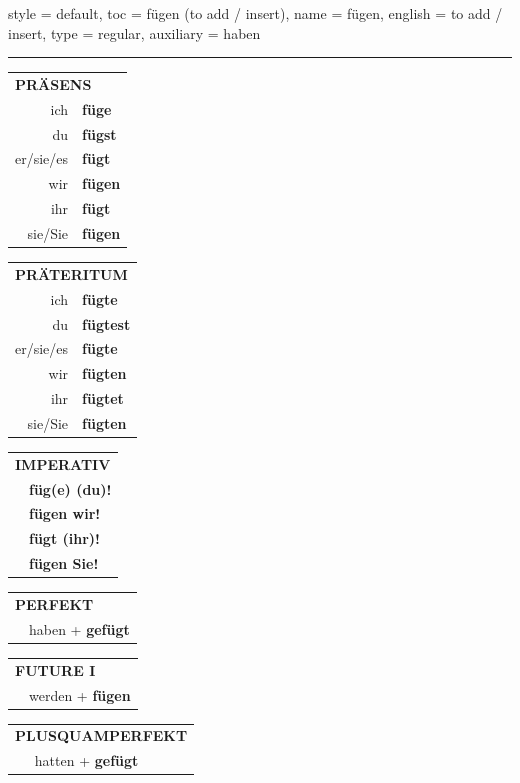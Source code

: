 \begin{verbentry}{
  style = {default},
  toc = {fügen (to add / insert)},
  name = {fügen},
  english = {to add / insert},
  type = {regular},
  auxiliary = {haben}
}


\vspace{5pt}
\hrule
\vspace{5pt}

\begin{tabular}{rl}
\multicolumn{2}{l}{\textbf{PRÄSENS}}\\
ich & \textbf{füge}\\
du & \textbf{fügst}\\
er/sie/es & \textbf{fügt}\\
wir & \textbf{fügen}\\
ihr & \textbf{fügt}\\
sie/Sie & \textbf{fügen}\\
\end{tabular}
\hfill
\begin{tabular}{rl}
\multicolumn{2}{l}{\textbf{PRÄTERITUM}}\\
ich & \textbf{fügte}\\
du & \textbf{fügtest}\\
er/sie/es & \textbf{fügte}\\
wir & \textbf{fügten}\\
ihr & \textbf{fügtet}\\
sie/Sie & \textbf{fügten}\\
\end{tabular}
\hfill
\begin{tabular}{rl}
\multicolumn{2}{l}{\textbf{IMPERATIV}}\\
& \textbf{füg(e) (du)!}\\
& \textbf{fügen wir!}\\
& \textbf{fügt (ihr)!}\\
& \textbf{fügen Sie!}\\
\end{tabular}

\vspace{10pt}

\begin{tabular}{rl}
\multicolumn{2}{l}{\textbf{PERFEKT}}\\
& haben + \textbf{gefügt}\\
\end{tabular}
\hfill
\begin{tabular}{rl}
\multicolumn{2}{l}{\textbf{FUTURE I}}\\
& werden + \textbf{fügen}\\
\end{tabular}
\hfill
\begin{tabular}{rl}
\multicolumn{2}{l}{\textbf{PLUSQUAMPERFEKT}}\\
& hatten + \textbf{gefügt}\\
\end{tabular}


\end{verbentry}
